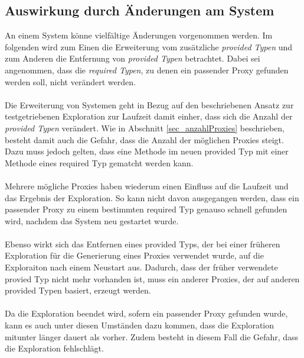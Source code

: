 \subsection{Auswirkung durch Änderungen am System}
An einem System könne vielfältige Änderungen vorgenommen werden. Im folgenden wird zum Einen die Erweiterung vom zusätzliche \emph{provided Typen} und zum Anderen die Entfernung von \emph{provided Typen} betrachtet. Dabei sei angenommen, dass die \emph{required Typen}, zu denen ein passender Proxy gefunden werden soll, nicht verändert werden.
\\\\
Die Erweiterung von Systemen geht in Bezug auf den beschriebenen Ansatz zur testgetriebenen Exploration zur Laufzeit damit einher, dass sich die Anzahl der \emph{provided Typen} verändert. Wie in Abschnitt \ref{sec_anzahlProxies} beschrieben, besteht damit auch die Gefahr, dass die Anzahl der möglichen Proxies steigt. Dazu muss jedoch gelten, dass eine Methode im neuen provided Typ mit einer Methode eines required Typ gematcht werden kann.
\\\\
Mehrere mögliche Proxies haben wiederum einen Einfluss auf die Laufzeit und das Ergebnis der Exploration. So kann nicht davon ausgegangen werden, dass ein passender Proxy zu einem bestimmten required Typ genauso schnell gefunden wird, nachdem das System neu gestartet wurde.
\\\\
Ebenso wirkt sich das Entfernen eines provided Typs, der bei einer früheren Exploration für die Generierung eines Proxies verwendet wurde, auf die Exploraiton nach einem Neustart aus. Dadurch, dass der früher verwendete provied Typ nicht mehr vorhanden ist, muss ein anderer Proxies, der auf anderen provided Typen basiert, erzeugt werden.
\\\\
Da die Exploration beendet wird, sofern ein passender Proxy gefunden wurde, kann es auch unter diesen Umständen dazu kommen, dass die Exploration mitunter länger dauert als vorher. Zudem besteht in diesem Fall die Gefahr, dass die Exploration fehlschlägt.






